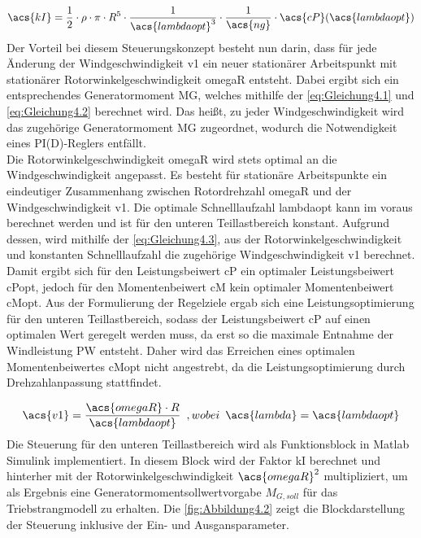 \begin{align}
   \acs{kI} = \frac{1}{2} \cdot \rho \cdot \pi \cdot R^5 \cdot \frac{1}{\acs{lambdaopt}^3} \cdot \frac{1}{\acs{ng}} \cdot \acs{cP}(\acs{lambdaopt})
   \label{eq:Gleichung4.2}
\end{align}
\newline
Der Vorteil bei diesem Steuerungskonzept besteht nun darin, dass für jede Änderung der Windgeschwindigkeit \acs{v1} ein neuer stationärer Arbeitspunkt mit stationärer Rotorwinkelgeschwindigkeit \acs{omegaR} entsteht. Dabei ergibt sich ein entsprechendes Generatormoment \acs{MG}, welches mithilfe der \autoref{eq:Gleichung4.1} und \autoref{eq:Gleichung4.2} berechnet wird. Das heißt, zu jeder Windgeschwindigkeit wird das zugehörige Generatormoment \acs{MG} zugeordnet, wodurch die Notwendigkeit eines PI(D)-Reglers entfällt.
\\
Die Rotorwinkelgeschwindigkeit \acs{omegaR} wird stets optimal an die Windgeschwindigkeit angepasst. Es besteht für stationäre Arbeitspunkte ein eindeutiger Zusammenhang zwischen Rotordrehzahl \acs{omegaR} und der Windgeschwindigkeit \acs{v1}. Die optimale Schnelllaufzahl \acs{lambdaopt} kann im voraus berechnet werden und ist für den unteren Teillastbereich konstant. Aufgrund dessen, wird mithilfe der \autoref{eq:Gleichung4.3}, aus der Rotorwinkelgeschwindigkeit und konstanten Schnelllaufzahl die zugehörige Windgeschwindigkeit \acs{v1} berechnet.  Damit ergibt sich für den Leistungsbeiwert \acs{cP} ein optimaler Leistungsbeiwert \acs{cPopt}, jedoch für den Momentenbeiwert \acs{cM} kein optimaler Momentenbeiwert \acs{cMopt}. Aus der Formulierung der Regelziele ergab sich eine Leistungsoptimierung für den unteren Teillastbereich, sodass der Leistungsbeiwert \acs{cP} auf einen optimalen Wert geregelt werden muss, da erst so die maximale Entnahme der Windleistung \acs{PW} entsteht. Daher wird das Erreichen eines optimalen Momentenbeiwertes \acs{cMopt} nicht angestrebt, da die Leistungsoptimierung durch Drehzahlanpassung stattfindet.   

\begin{align}
    \acs{v1} = \frac{\acs{omegaR} \cdot {R}}{\acs{lambdaopt}} \enspace ,wobei \enspace \acs{lambda} = \acs{lambdaopt}
    \label{eq:Gleichung4.3}
\end{align}
\newline
Die Steuerung für den unteren Teillastbereich wird als Funktionsblock in Matlab Simulink implementiert. In diesem Block wird der Faktor \acs{kI} berechnet und hinterher mit der Rotorwinkelgeschwindigkeit $\acs{omegaR}^2$ multipliziert, um als Ergebnis eine Generatormomentsollwertvorgabe $M_{G,soll}$ für das Triebstrangmodell zu erhalten. Die \autoref{fig:Abbildung4.2} zeigt die Blockdarstellung der Steuerung inklusive der Ein- und Ausgansparameter.

